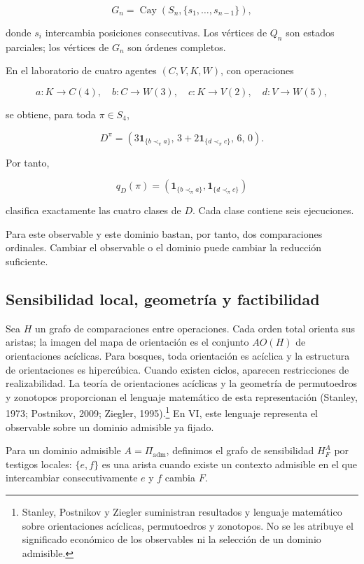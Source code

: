 \documentclass[10pt,a5paper,twoside]{article}
\begin{document}
\[
G_n
=
\operatorname{Cay}
(S_n,\{s_1,\ldots,s_{n-1}\}),
\]

donde \(s_i\) intercambia posiciones consecutivas. Los vértices de
\(Q_n\) son estados parciales; los vértices de \(G_n\) son órdenes
completos.

En el laboratorio de cuatro agentes \((C,V,K,W)\), con operaciones

\[
a:K\to C(4),\quad
b:C\to W(3),\quad
c:K\to V(2),\quad
d:V\to W(5),
\]

se obtiene, para toda \(\pi\in S_4\),

\[
D^\pi
=
\left(
3\mathbf1_{\{b\prec_\pi a\}},
\,
3+2\mathbf1_{\{d\prec_\pi c\}},
\,
6,
\,
0
\right).
\]

Por tanto,

\[
q_D(\pi)
=
\left(
\mathbf1_{\{b\prec_\pi a\}},
\mathbf1_{\{d\prec_\pi c\}}
\right)
\]

clasifica exactamente las cuatro clases de \(D\). Cada clase contiene
seis ejecuciones.

Para este observable y este dominio bastan, por tanto, dos comparaciones
ordinales. Cambiar el observable o el dominio puede cambiar la reducción
suficiente.

\subsection{Sensibilidad local, geometría y factibilidad}\label{sensibilidad-local-geometruxeda-y-factibilidad}

Sea \(H\) un grafo de comparaciones entre operaciones. Cada orden total
orienta sus aristas; la imagen del mapa de orientación es el conjunto
\(AO(H)\) de orientaciones acíclicas. Para bosques, toda orientación es
acíclica y la estructura de orientaciones es hipercúbica. Cuando existen
ciclos, aparecen restricciones de realizabilidad. La teoría de
orientaciones acíclicas y la geometría de permutoedros y zonotopos
proporcionan el lenguaje matemático de esta representación (Stanley,
1973; Postnikov, 2009; Ziegler, 1995).\footnote{Stanley, Postnikov y
  Ziegler suministran resultados y lenguaje matemático sobre
  orientaciones acíclicas, permutoedros y zonotopos. No se les atribuye
  el significado económico de los observables ni la selección de un
  dominio admisible.} En VI, este lenguaje representa el observable sobre un dominio admisible ya
fijado.

Para un dominio admisible \(A=\Pi_{\mathrm{adm}}\), definimos el grafo
de sensibilidad \(H_F^A\) por testigos locales: \(\{e,f\}\) es una
arista cuando existe un contexto admisible en el que intercambiar
consecutivamente \(e\) y \(f\) cambia \(F\).
\end{document}
